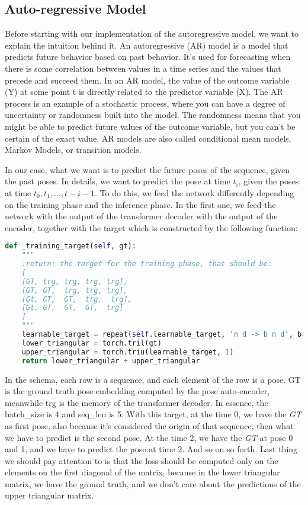 \subsection{Auto-regressive Model}\label{subsec:auto-regressive-model}
Before starting with our implementation of the autoregressive model, we want to explain the intuition behind it.
An autoregressive (AR) model is a model that predicts future behavior based on past behavior.
It's used for forecasting when there is some correlation between values in a time series and the values that precede and succeed them.
In an AR model, the value of the outcome variable (Y) at some point t is directly related to the predictor variable (X).
The AR process is an example of a stochastic process, where you can have a degree of uncertainty or randomness built into the model.
The randomness means that you might be able to predict future values of the outcome variable, but you can't be certain of the exact value.
AR models are also called conditional mean models, Markov Models, or transition models.

In our case, what we want is to predict the future poses of the sequence, given the past poses.
In details, we want to predict the pose at time $t_i$, given the poses at time $t_0, t_1, \dots, t-i-1$.
To do this, we feed the network differently depending on the training phase and the inference phase.
In the first one, we feed the network with the output of the transformer decoder with the output of the encoder, together with the target which is constructed by the following function:
\begin{lstlisting}[label={lst:lst-training-target}, caption={Training target}, language=Python]
def _training_target(self, gt):
    """
    :return: the target for the training phase, that should be:
    [
    [GT, trg, trg, trg, trg],
    [GT, GT,  trg, trg, trg],
    [Gt, GT,  GT,  trg,  trg],
    [Gt, GT,  GT,  GT,  trg]
    ]
    """
    learnable_target = repeat(self.learnable_target, 'n d -> b n d', b=gt.shape[0])
    lower_triangular = torch.tril(gt)
    upper_triangular = torch.triu(learnable_target, 1)
    return lower_triangular + upper_triangular
\end{lstlisting}
In the schema, each row is a sequence, and each element of the row is a pose.
GT is the ground truth pose embedding computed by the pose auto-encoder, meanwhile trg is the memory of the transformer decoder.
In essence, the batch\_size is 4 and seq\_len is 5.
With this target, at the time 0, we have the \textit{GT} as first pose, also because it's considered the origin of that sequence, then what we have to predict is the second pose.
At the time 2, we have the \textit{GT} at pose 0 and 1, and we have to predict the pose at time 2.
And so on so forth.
Last thing we should pay attention to is that the loss should be computed only on the elements on the first diagonal of the matrix, because in the lower triangular matrix, we have the ground truth, and we don't care about the predictions of the upper triangular matrix.

